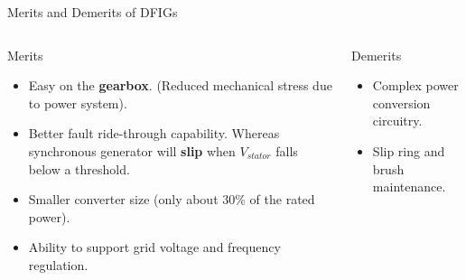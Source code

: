 \documentclass{beamer}
\begin{document}
\begin{frame}{Merits and Demerits of DFIGs}
  \begin{columns}[T]
    \begin{block}{Merits}
      \begin{itemize}
      \item Easy on the \textbf{gearbox}. (Reduced mechanical stress due to power system).
   
        \item Better fault ride-through capability. Whereas synchronous generator will \textbf{slip} when $V_{stator}$ falls below a threshold.
           \pause
        \item Smaller converter size (only about 30\% of the rated power).
        
        \item Ability to support grid voltage and frequency regulation.
      \end{itemize}
    \end{block}
    \begin{block}{Demerits}
      \begin{itemize}
        \item Complex power conversion circuitry.
        \item Slip ring and brush maintenance.
      \end{itemize}
    \end{block}
  \end{columns}
\end{frame}
\end{document}
